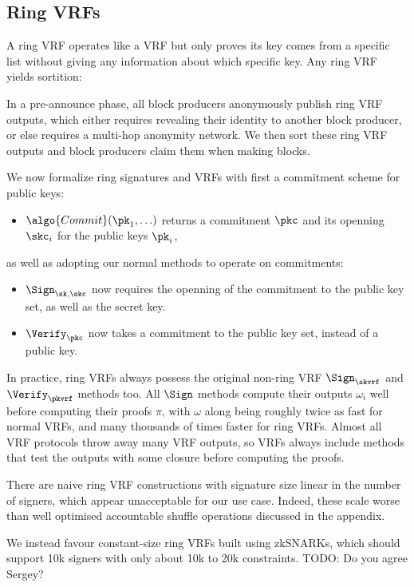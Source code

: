 \subsection{Ring VRFs}

A ring VRF operates like a VRF but only proves its key comes from a specific list without giving any information about which specific key.  Any ring VRF yields sortition:

In a pre-announce phase, all block producers anonymously publish ring VRF outputs, which either requires revealing their identity to another block producer, or else requires a multi-hop anonymity network.  We then sort these ring VRF outputs and block producers claim them when making blocks.

We now formalize ring signatures and VRFs with first a commitment scheme for public keys:
\begin{itemize}
\item $\algo{Commit}(\pk_1,\ldots)$ returns a commitment $\pkc$ and its openning $\skc_i$ for the public keys $\pk_i$,
\end{itemize}
as well as adopting our normal methods to operate on commitments:
\begin{itemize}
\item $\Sign_{\sk,\skc}$ now requires the openning of the commitment to the public key set, as well as the secret key.
\item $\Verify_{\pkc}$ now takes a commitment to the public key set, instead of a public key.
\end{itemize}
In practice, ring VRFs always possess the original non-ring VRF $\Sign_{\skvrf}$ and $\Verify_{\pkvrf}$ methods too.  All $\Sign$ methods compute their outputs $\omega_i$ well before computing their proofs $\pi$, with $\omega$ along being roughly twice as fast for normal VRFs, and many thousands of times faster for ring VRFs.  Almost all VRF protocols throw away many VRF outputs, so VRFs always include methods that test the outputs with some closure before computing the proofs.

There are naive ring VRF constructions with signature size linear in the number of signers, which appear unacceptable for our use case.  Indeed, these scale worse than well optimised accountable shuffle operations discussed in the appendix.


We instead favour constant-size ring VRFs built using zkSNARKs, which should support 10k signers with only about 10k to 20k constraints.  TODO: Do you agree Sergey?


